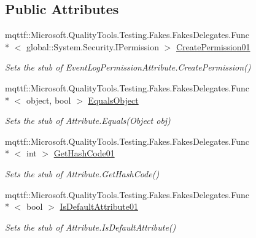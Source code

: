 \subsection*{Public Attributes}
\begin{DoxyCompactItemize}
\item 
mqttf\-::\-Microsoft.\-Quality\-Tools.\-Testing.\-Fakes.\-Fakes\-Delegates.\-Func\\*
$<$ global\-::\-System.\-Security.\-I\-Permission $>$ \hyperlink{class_system_1_1_diagnostics_1_1_fakes_1_1_stub_event_log_permission_attribute_a09f3e4c16e0a897268e4edf8af09f606}{Create\-Permission01}
\begin{DoxyCompactList}\small\item\em Sets the stub of Event\-Log\-Permission\-Attribute.\-Create\-Permission()\end{DoxyCompactList}\item 
mqttf\-::\-Microsoft.\-Quality\-Tools.\-Testing.\-Fakes.\-Fakes\-Delegates.\-Func\\*
$<$ object, bool $>$ \hyperlink{class_system_1_1_diagnostics_1_1_fakes_1_1_stub_event_log_permission_attribute_abe266897789eabf77da57ae79c63a3ce}{Equals\-Object}
\begin{DoxyCompactList}\small\item\em Sets the stub of Attribute.\-Equals(\-Object obj)\end{DoxyCompactList}\item 
mqttf\-::\-Microsoft.\-Quality\-Tools.\-Testing.\-Fakes.\-Fakes\-Delegates.\-Func\\*
$<$ int $>$ \hyperlink{class_system_1_1_diagnostics_1_1_fakes_1_1_stub_event_log_permission_attribute_acfa363f1b6ff105895eb9f60ed718c77}{Get\-Hash\-Code01}
\begin{DoxyCompactList}\small\item\em Sets the stub of Attribute.\-Get\-Hash\-Code()\end{DoxyCompactList}\item 
mqttf\-::\-Microsoft.\-Quality\-Tools.\-Testing.\-Fakes.\-Fakes\-Delegates.\-Func\\*
$<$ bool $>$ \hyperlink{class_system_1_1_diagnostics_1_1_fakes_1_1_stub_event_log_permission_attribute_a76ec468c59af18365d8ef46d4b1a537d}{Is\-Default\-Attribute01}
\begin{DoxyCompactList}\small\item\em Sets the stub of Attribute.\-Is\-Default\-Attribute()\end{DoxyCompactList}\item 

\end{DoxyCompactItemize}
